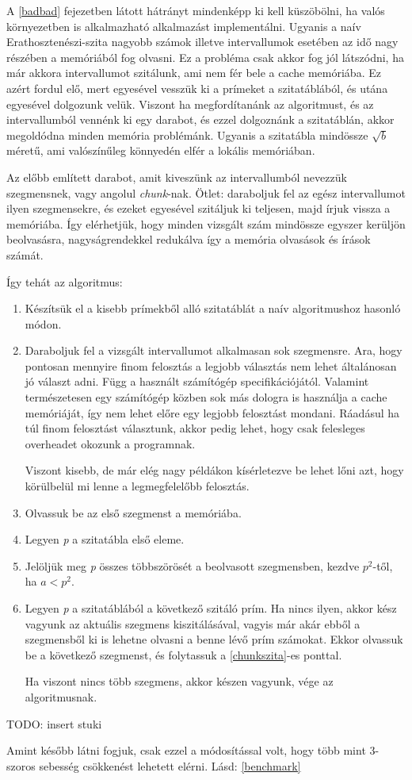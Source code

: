 \documentclass[twoside, a4paper, 12pt]{article}
\begin{document}
A \ref{badbad} fejezetben látott hátrányt mindenképp ki kell küszöbölni, ha valós környezetben is alkalmazható alkalmazást implementálni. Ugyanis a naív Erathosztenészi-szita nagyobb számok illetve intervallumok esetében az idő nagy részében a memóriából fog olvasni. Ez a probléma csak akkor fog jól látszódni, ha már akkora intervallumot szitálunk, ami nem fér bele a cache memóriába. Ez azért fordul elő, mert egyesével vesszük ki a prímeket a szitatáblából, és utána egyesével dolgozunk velük. Viszont ha megfordítanánk az algoritmust, és az intervallumból vennénk ki egy darabot, és ezzel dolgoznánk a szitatáblán, akkor megoldódna minden memória problémánk. Ugyanis a szitatábla mindössze $\sqrt{b}$ méretű, ami valószínűleg könnyedén elfér a lokális memóriában. \par 
Az előbb említett darabot, amit kiveszünk az intervallumból nevezzük szegmensnek, vagy angolul \textit{chunk}-nak. Ötlet: daraboljuk fel az egész intervallumot ilyen szegmensekre, és ezeket egyesével szitáljuk ki teljesen, majd írjuk vissza a memóriába. Így elérhetjük, hogy minden vizsgált szám mindössze egyszer kerüljön beolvasásra, nagyságrendekkel redukálva így a memória olvasások és írások számát. \par
Így tehát az algoritmus: \par
\begin{enumerate}
\item Készítsük el a kisebb prímekből alló szitatáblát a naív algoritmushoz hasonló módon.
\item Daraboljuk fel a vizsgált intervallumot alkalmasan sok szegmensre. Ara, hogy pontosan mennyire finom felosztás a legjobb választás nem lehet általánosan jó választ adni. Függ a használt számítógép specifikációjától. Valamint természetesen egy számítógép közben sok más dologra is használja a cache memóriáját, így nem lehet előre egy legjobb felosztást mondani. Ráadásul ha túl finom felosztást választunk, akkor pedig lehet, hogy csak felesleges overheadet okozunk a programnak. \par
Viszont kisebb, de már elég nagy példákon kísérletezve be lehet lőni azt, hogy körülbelül mi lenne a legmegfelelőbb felosztás.
\item Olvassuk be az első szegmenst a memóriába.
\item Legyen \textit{p} a szitatábla első eleme. \label{chunkszita}
\item Jelöljük meg \textit{p} összes többszörösét a beolvasott szegmensben, kezdve $p^2$-től, ha $a<p^2$.
\item Legyen \textit{p} a szitatáblából a következő szitáló prím. Ha nincs ilyen, akkor kész vagyunk az aktuális szegmens kiszitálásával, vagyis már akár ebből a szegmensből ki is lehetne olvasni a benne lévő prím számokat. Ekkor olvassuk be a következő szegmenst, és folytassuk a \ref{chunkszita}-es ponttal. \par
Ha viszont nincs több szegmens, akkor készen vagyunk, vége az algoritmusnak. 
\end{enumerate}
TODO: insert stuki \par
Amint később látni fogjuk, csak ezzel a módosítással volt, hogy több mint 3-szoros sebesség csökkenést lehetett elérni. Lásd: \ref{benchmark}
\end{document}
